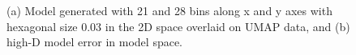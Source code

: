 \documentclass[
  12pt]{article}
\begin{document}
\begin{figure}[H]


\caption{\label{fig-nldervisPBMCUMAP}(a) Model generated with 21 and 28
bins along x and y axes with hexagonal size 0.03 in the 2D space
overlaid on UMAP data, and (b) high-D model error in model space.}

\end{figure}%
\end{document}
